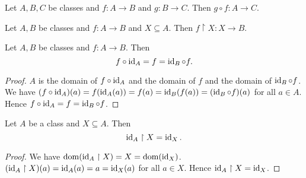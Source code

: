\documentclass[../../set-theory/set-theory.tex]{subfiles}
\begin{document}
  \begin{forthel}
    \begin{proposition}
      Let $A, B, C$ be classes and $f : A \to B$ and $g : B \to C$.
      Then $g \circ f : A \to C$.
    \end{proposition}
  \end{forthel}

  \begin{forthel}
    \begin{proposition}
      Let $A, B$ be classes and $f : A \to B$ and $X \subseteq A$.
      Then $f \restriction X : X \to B$.
    \end{proposition}
  \end{forthel}

  \begin{forthel}
    \begin{proposition}
      Let $A, B$ be classes and $f : A \to B$.
      Then \[ f \circ \operatorname{id}_{A} = f = \operatorname{id}_{B} \circ f. \]
    \end{proposition}
    \begin{proof}
      $A$ is the domain of $f \circ \operatorname{id}_{A}$ and the domain of $f$ and the domain of $\operatorname{id}_{B} \circ f$.
      We have $(f \circ \operatorname{id}_{A})(a) =
      f(\operatorname{id}_{A}(a)) =
      f(a) =
      \operatorname{id}_{B}(f(a)) =
      (\operatorname{id}_{B} \circ f)(a)$ for all $a \in A$.
      Hence $f \circ \operatorname{id}_{A} = f = \operatorname{id}_{B} \circ f$.
    \end{proof}
  \end{forthel}

  \begin{forthel}
    \begin{proposition}
      Let $A$ be a class and $X \subseteq A$.
      Then \[ \operatorname{id}_{A} \restriction X = \operatorname{id}_{X}. \]
    \end{proposition}
    \begin{proof}
      We have $\operatorname{dom}(\operatorname{id}_{A} \restriction X) = X = \operatorname{dom}(\operatorname{id}_{X})$.
      $(\operatorname{id}_{A} \restriction X)(a) = \operatorname{id}_{A}(a) = a = \operatorname{id}_{X}(a)$ for all $a \in X$.
      Hence $\operatorname{id}_{A} \restriction X = \operatorname{id}_{X}$.
    \end{proof}
  \end{forthel}
\end{document}
